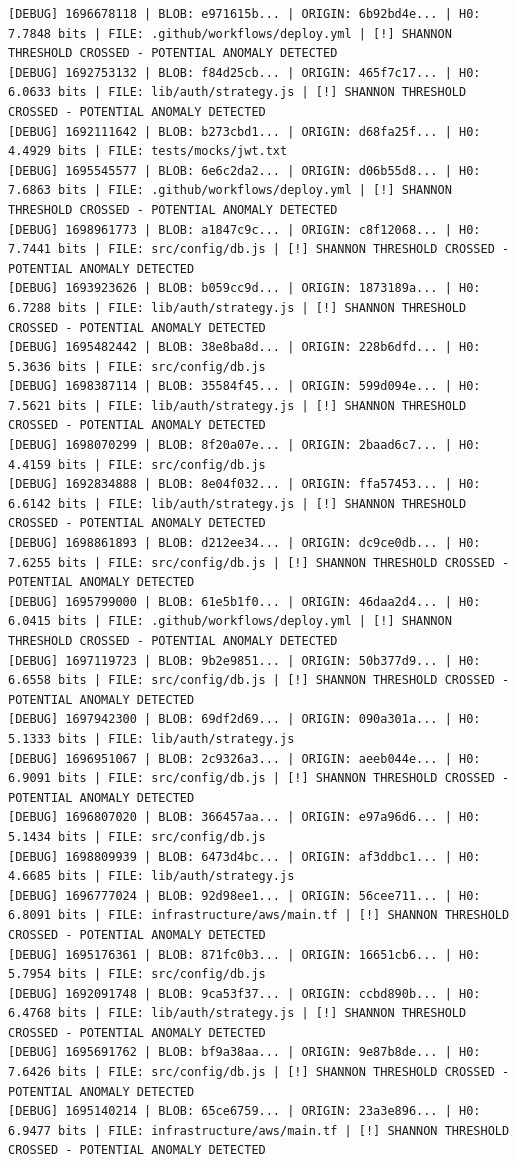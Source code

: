 \documentclass[12pt, a4paper, oneside]{report}
\begin{document}
\begin{lstlisting}[basicstyle=\tiny\ttfamily]
[DEBUG] 1696678118 | BLOB: e971615b... | ORIGIN: 6b92bd4e... | H0: 7.7848 bits | FILE: .github/workflows/deploy.yml | [!] SHANNON THRESHOLD CROSSED - POTENTIAL ANOMALY DETECTED
[DEBUG] 1692753132 | BLOB: f84d25cb... | ORIGIN: 465f7c17... | H0: 6.0633 bits | FILE: lib/auth/strategy.js | [!] SHANNON THRESHOLD CROSSED - POTENTIAL ANOMALY DETECTED
[DEBUG] 1692111642 | BLOB: b273cbd1... | ORIGIN: d68fa25f... | H0: 4.4929 bits | FILE: tests/mocks/jwt.txt
[DEBUG] 1695545577 | BLOB: 6e6c2da2... | ORIGIN: d06b55d8... | H0: 7.6863 bits | FILE: .github/workflows/deploy.yml | [!] SHANNON THRESHOLD CROSSED - POTENTIAL ANOMALY DETECTED
[DEBUG] 1698961773 | BLOB: a1847c9c... | ORIGIN: c8f12068... | H0: 7.7441 bits | FILE: src/config/db.js | [!] SHANNON THRESHOLD CROSSED - POTENTIAL ANOMALY DETECTED
[DEBUG] 1693923626 | BLOB: b059cc9d... | ORIGIN: 1873189a... | H0: 6.7288 bits | FILE: lib/auth/strategy.js | [!] SHANNON THRESHOLD CROSSED - POTENTIAL ANOMALY DETECTED
[DEBUG] 1695482442 | BLOB: 38e8ba8d... | ORIGIN: 228b6dfd... | H0: 5.3636 bits | FILE: src/config/db.js
[DEBUG] 1698387114 | BLOB: 35584f45... | ORIGIN: 599d094e... | H0: 7.5621 bits | FILE: lib/auth/strategy.js | [!] SHANNON THRESHOLD CROSSED - POTENTIAL ANOMALY DETECTED
[DEBUG] 1698070299 | BLOB: 8f20a07e... | ORIGIN: 2baad6c7... | H0: 4.4159 bits | FILE: src/config/db.js
[DEBUG] 1692834888 | BLOB: 8e04f032... | ORIGIN: ffa57453... | H0: 6.6142 bits | FILE: lib/auth/strategy.js | [!] SHANNON THRESHOLD CROSSED - POTENTIAL ANOMALY DETECTED
[DEBUG] 1698861893 | BLOB: d212ee34... | ORIGIN: dc9ce0db... | H0: 7.6255 bits | FILE: src/config/db.js | [!] SHANNON THRESHOLD CROSSED - POTENTIAL ANOMALY DETECTED
[DEBUG] 1695799000 | BLOB: 61e5b1f0... | ORIGIN: 46daa2d4... | H0: 6.0415 bits | FILE: .github/workflows/deploy.yml | [!] SHANNON THRESHOLD CROSSED - POTENTIAL ANOMALY DETECTED
[DEBUG] 1697119723 | BLOB: 9b2e9851... | ORIGIN: 50b377d9... | H0: 6.6558 bits | FILE: src/config/db.js | [!] SHANNON THRESHOLD CROSSED - POTENTIAL ANOMALY DETECTED
[DEBUG] 1697942300 | BLOB: 69df2d69... | ORIGIN: 090a301a... | H0: 5.1333 bits | FILE: lib/auth/strategy.js
[DEBUG] 1696951067 | BLOB: 2c9326a3... | ORIGIN: aeeb044e... | H0: 6.9091 bits | FILE: src/config/db.js | [!] SHANNON THRESHOLD CROSSED - POTENTIAL ANOMALY DETECTED
[DEBUG] 1696807020 | BLOB: 366457aa... | ORIGIN: e97a96d6... | H0: 5.1434 bits | FILE: src/config/db.js
[DEBUG] 1698809939 | BLOB: 6473d4bc... | ORIGIN: af3ddbc1... | H0: 4.6685 bits | FILE: lib/auth/strategy.js
[DEBUG] 1696777024 | BLOB: 92d98ee1... | ORIGIN: 56cee711... | H0: 6.8091 bits | FILE: infrastructure/aws/main.tf | [!] SHANNON THRESHOLD CROSSED - POTENTIAL ANOMALY DETECTED
[DEBUG] 1695176361 | BLOB: 871fc0b3... | ORIGIN: 16651cb6... | H0: 5.7954 bits | FILE: src/config/db.js
[DEBUG] 1692091748 | BLOB: 9ca53f37... | ORIGIN: ccbd890b... | H0: 6.4768 bits | FILE: lib/auth/strategy.js | [!] SHANNON THRESHOLD CROSSED - POTENTIAL ANOMALY DETECTED
[DEBUG] 1695691762 | BLOB: bf9a38aa... | ORIGIN: 9e87b8de... | H0: 7.6426 bits | FILE: src/config/db.js | [!] SHANNON THRESHOLD CROSSED - POTENTIAL ANOMALY DETECTED
[DEBUG] 1695140214 | BLOB: 65ce6759... | ORIGIN: 23a3e896... | H0: 6.9477 bits | FILE: infrastructure/aws/main.tf | [!] SHANNON THRESHOLD CROSSED - POTENTIAL ANOMALY DETECTED
\end{lstlisting}
\end{document}
